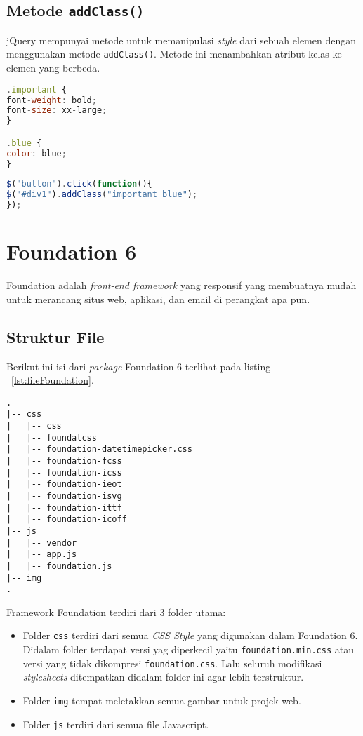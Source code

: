 \subsection{Metode \texttt{addClass()}}
jQuery mempunyai metode untuk memanipulasi \textit{style} dari sebuah elemen dengan menggunakan metode \texttt{addClass()}. Metode ini menambahkan atribut kelas ke elemen yang berbeda. 
\begin{lstlisting}[style=JavaScript, language=JavaScript,  basicstyle=\ttfamily, frame=single, columns=fullflexible, keepspaces=true, breaklines=true, showstringspaces=false, label=stylejQuery]
.important {
font-weight: bold;
font-size: xx-large;
}

.blue {
color: blue;
}
\end{lstlisting}
\begin{lstlisting}[style=JavaScript, language=JavaScript, basicstyle=\ttfamily, frame=single, columns=fullflexible, keepspaces=true, breaklines=true, showstringspaces=false, label={lst:addClass}, caption=Metode addClass().]
$("button").click(function(){
$("#div1").addClass("important blue");
});
\end{lstlisting}


\section{Foundation 6}
\label{sec:foundation}
Foundation adalah \textit{front-end framework} yang responsif yang membuatnya mudah untuk merancang situs web, aplikasi, dan email di perangkat apa pun.

\subsection{Struktur File}
Berikut ini isi dari \textit{package} Foundation 6 terlihat pada listing ~\ref{lst:fileFoundation}.
\begin{lstlisting}[basicstyle=\ttfamily, frame=single, columns=fullflexible, keepspaces=true, breaklines=true, showstringspaces=false, label={lst:fileFoundation}, caption=Struktur File Foundation.]
.
|-- css
|   |-- css 
|   |-- foundatcss 
|   |-- foundation-datetimepicker.css 
|   |-- foundation-fcss 
|   |-- foundation-icss 
|   |-- foundation-ieot 
|   |-- foundation-isvg 
|   |-- foundation-ittf 
|   |-- foundation-icoff 
|-- js
|   |-- vendor 
|   |-- app.js 
|   |-- foundation.js 
|-- img
.
\end{lstlisting}

Framework Foundation terdiri dari 3 folder utama:
\begin{itemize}
	\item Folder \texttt{css} terdiri dari semua \textit{CSS Style} yang digunakan dalam Foundation 6. Didalam folder terdapat versi yag diperkecil yaitu \verb|foundation.min.css| atau versi yang tidak dikompresi \verb|foundation.css|. Lalu seluruh modifikasi \textit{stylesheets} ditempatkan didalam folder ini agar lebih terstruktur.
	\item Folder \texttt{img} tempat meletakkan semua gambar untuk projek web.
	\item Folder \texttt{js} terdiri dari semua file Javascript.
\end{itemize} 
\cite{zurbfoundation:17}

